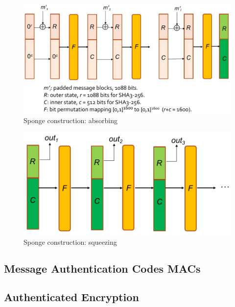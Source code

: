 \begin{figure}[h]
    \centering
	\includegraphics[scale=0.35]{images/sponge-absorb.png}
    \caption{Sponge construction: absorbing}
    \label{fig:sponge-absorb}
\end{figure}
\begin{figure}[h]
    \centering
	\includegraphics[scale=0.35]{images/sponge-squeeze.png}
    \caption{Sponge construction: squeezing}
    \label{fig:sponge-squeeze}
\end{figure}



\subsection{Message Authentication Codes MACs}


\subsection{Authenticated Encryption}


